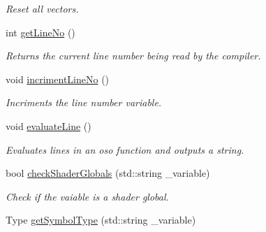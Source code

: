\begin{DoxyCompactItemize}
\begin{DoxyCompactList}\small\item\em Reset all vectors. \end{DoxyCompactList}\item 
\hypertarget{class_oso_reader_a6549d0c2b47de835cdcb67994af8a65b}{int \hyperlink{class_oso_reader_a6549d0c2b47de835cdcb67994af8a65b}{get\-Line\-No} ()}\label{class_oso_reader_a6549d0c2b47de835cdcb67994af8a65b}

\begin{DoxyCompactList}\small\item\em Returns the current line number being read by the compiler. \end{DoxyCompactList}\item 
\hypertarget{class_oso_reader_a8d21cee511d258a3b82e0781b406a265}{void \hyperlink{class_oso_reader_a8d21cee511d258a3b82e0781b406a265}{incriment\-Line\-No} ()}\label{class_oso_reader_a8d21cee511d258a3b82e0781b406a265}

\begin{DoxyCompactList}\small\item\em Incriments the line number variable. \end{DoxyCompactList}\item 
\hypertarget{class_oso_reader_ad338cc5bc40d56729831448bbcd4651d}{void \hyperlink{class_oso_reader_ad338cc5bc40d56729831448bbcd4651d}{evaluate\-Line} ()}\label{class_oso_reader_ad338cc5bc40d56729831448bbcd4651d}

\begin{DoxyCompactList}\small\item\em Evaluates lines in an oso function and outputs a string. \end{DoxyCompactList}\item 
\hypertarget{class_oso_reader_a8d58bcba035401b2e59ad8d053dd91cf}{bool \hyperlink{class_oso_reader_a8d58bcba035401b2e59ad8d053dd91cf}{check\-Shader\-Globals} (std\-::string \-\_\-variable)}\label{class_oso_reader_a8d58bcba035401b2e59ad8d053dd91cf}

\begin{DoxyCompactList}\small\item\em Check if the vaiable is a shader global. \end{DoxyCompactList}\item 
\hypertarget{class_oso_reader_a8fbdd221292ac5eac13fac373456bca5}{Type \hyperlink{class_oso_reader_a8fbdd221292ac5eac13fac373456bca5}{get\-Symbol\-Type} (std\-::string \-\_\-variable)}\label{class_oso_reader_a8fbdd221292ac5eac13fac373456bca5}


\end{DoxyCompactItemize}
